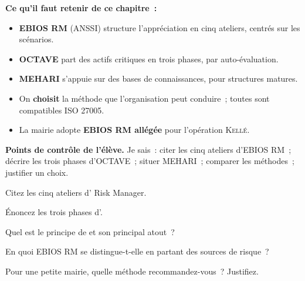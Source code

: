 \begin{boxresume}
\textbf{Ce qu'il faut retenir de ce chapitre~:}
\begin{itemize}
    \item \textbf{EBIOS RM} (ANSSI) structure l'appréciation en cinq ateliers,
          centrés sur les scénarios.
    \item \textbf{OCTAVE} part des actifs critiques en trois phases, par
          auto-évaluation.
    \item \textbf{MEHARI} s'appuie sur des bases de connaissances, pour
          structures matures.
    \item On \textbf{choisit} la méthode que l'organisation peut conduire~;
          toutes sont compatibles ISO 27005.
    \item La mairie adopte \textbf{EBIOS RM allégée} pour l'opération
          \textsc{Kellé}.
\end{itemize}
\end{boxresume}

\begin{boxinfo}
\textbf{Points de contrôle de l'élève.} Je sais~: citer les cinq ateliers
d'EBIOS RM~; décrire les trois phases d'OCTAVE~; situer MEHARI~; comparer les
méthodes~; justifier un choix.
\end{boxinfo}

\bigskip

\begin{boxexo}[title={\ding{45}\quad Exercice~12.1. Les ateliers \niveaubase}]
Citez les cinq ateliers d' Risk Manager.
\end{boxexo}

\begin{boxexo}[title={\ding{45}\quad Exercice~12.2. Les phases \niveaubase}]
Énoncez les trois phases d'.
\end{boxexo}

\begin{boxexo}[title={\ding{45}\quad Exercice~12.3. MEHARI \niveaubase}]
Quel est le principe de  et son principal atout~?
\end{boxexo}

\begin{boxexo}[title={\ding{45}\quad Exercice~12.4. Source de risque \niveaumoyen}]
En quoi EBIOS RM se distingue-t-elle en partant des sources de risque~?
\end{boxexo}

\begin{boxexo}[title={\ding{45}\quad Exercice~12.5. Choisir \niveaumoyen}]
Pour une petite mairie, quelle méthode recommandez-vous~? Justifiez.
\end{boxexo}


